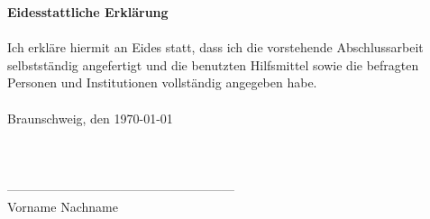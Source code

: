 \clearpage
\pagestyle{empty}
\textbf{Eidesstattliche Erkl\"arung}
\\
\\
Ich erkl\"are hiermit an Eides statt, dass ich die vorstehende Abschlussarbeit selbstst\"andig angefertigt und die benutzten Hilfsmittel sowie die befragten Personen und Institutionen vollst\"andig angegeben habe.\\
\\
Braunschweig, den \today\\
\\
\\
\\
------------------------------------------------------\\
Vorname Nachname